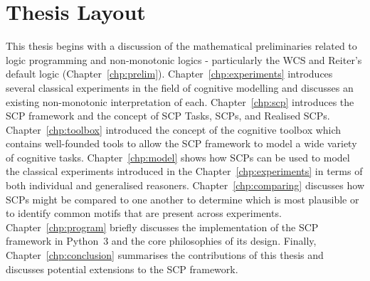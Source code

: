 \section{Thesis Layout} \label{sec:layout}
This thesis begins with a discussion of the mathematical preliminaries related to logic programming and non-monotonic logics - particularly the WCS and Reiter's default logic (Chapter~\ref{chp:prelim}). Chapter~\ref{chp:experiments} introduces several classical experiments in the field of cognitive modelling and discusses an existing non-monotonic interpretation of each. Chapter~\ref{chp:scp} introduces the SCP framework and the concept of SCP Tasks, SCPs, and Realised SCPs. Chapter~\ref{chp:toolbox} introduced the concept of the cognitive toolbox which contains well-founded tools to allow the SCP framework to model a wide variety of cognitive tasks. Chapter~\ref{chp:model} shows how SCPs can be used to model the classical experiments introduced in the Chapter~\ref{chp:experiments} in terms of both individual and generalised reasoners. Chapter~\ref{chp:comparing} discusses how SCPs might be compared to one another to determine which is most plausible or to identify common motifs that are present across experiments. Chapter~\ref{chp:program} briefly discusses the implementation of the SCP framework in Python~3 and the core philosophies of its design. Finally, Chapter~\ref{chp:conclusion} summarises the contributions of this thesis and discusses potential extensions to the SCP framework.